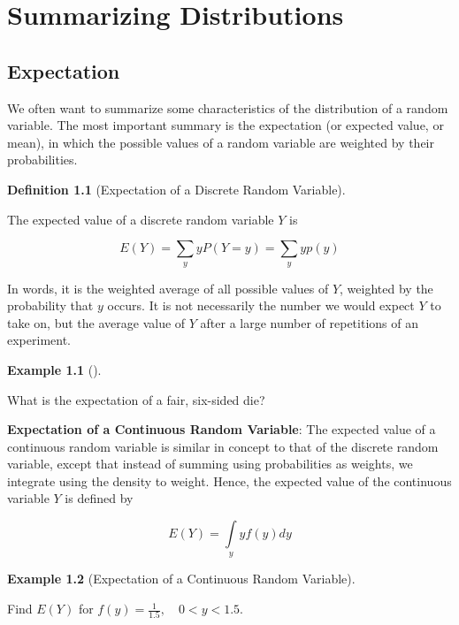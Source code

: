 \documentclass[
  letterpaper,
]{book}
\theoremstyle{definition}
\newtheorem{definition}{Definition}[chapter]
\theoremstyle{definition}
\newtheorem{example}{Example}[chapter]
\theoremstyle{plain}
\theoremstyle{definition}
\theoremstyle{plain}
\theoremstyle{plain}
\theoremstyle{remark}
\begin{document}
\hypertarget{distribution}{%
\chapter{Summarizing Distributions}\label{distribution}}

\hypertarget{expectation}{%
\section{Expectation}\label{expectation}}

We often want to summarize some characteristics of the distribution of a
random variable. The most important summary is the expectation (or
expected value, or mean), in which the possible values of a random
variable are weighted by their probabilities.

\leavevmode{}%
\begin{definition}[Expectation of a Discrete Random
Variable]\label{def-}

The expected value of a discrete random variable \(Y\) is

\[E(Y)=\sum\limits_{y} y P(Y=y)= \sum\limits_{y} y p(y)\]

In words, it is the weighted average of all possible values of \(Y\),
weighted by the probability that \(y\) occurs. It is not necessarily the
number we would expect \(Y\) to take on, but the average value of \(Y\)
after a large number of repetitions of an experiment.

\end{definition}

\leavevmode{}%
\begin{example}[]\label{exm-expectdiscrete}

What is the expectation of a fair, six-sided die?

\end{example}

\textbf{Expectation of a Continuous Random Variable}: The expected value
of a continuous random variable is similar in concept to that of the
discrete random variable, except that instead of summing using
probabilities as weights, we integrate using the density to weight.
Hence, the expected value of the continuous variable \(Y\) is defined by

\[E(Y)=\int\limits_{y} y f(y) dy\]

\leavevmode{}%
\begin{example}[Expectation of a Continuous Random
Variable]\label{exm-expectconti}

Find \(E(Y)\) for \(f(y)=\frac{1}{1.5}, \quad 0<y<1.5\).

\end{example}
\end{document}
